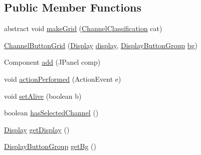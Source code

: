 \subsection*{Public Member Functions}
\begin{DoxyCompactItemize}
\item 
abstract void \hyperlink{classgov_1_1fnal_1_1ppd_1_1dd_1_1changer_1_1ChannelButtonGrid_a5acf39593b87514d5015b219e91ddeac}{make\-Grid} (\hyperlink{classgov_1_1fnal_1_1ppd_1_1dd_1_1changer_1_1ChannelClassification}{Channel\-Classification} cat)
\item 
\hyperlink{classgov_1_1fnal_1_1ppd_1_1dd_1_1changer_1_1ChannelButtonGrid_a71bade30c8299336c618dbc8f32b3a07}{Channel\-Button\-Grid} (\hyperlink{interfacegov_1_1fnal_1_1ppd_1_1dd_1_1signage_1_1Display}{Display} \hyperlink{classgov_1_1fnal_1_1ppd_1_1dd_1_1changer_1_1ChannelButtonGrid_a3c06b51489dcaacd16f6efcefe06bcaa}{display}, \hyperlink{classgov_1_1fnal_1_1ppd_1_1dd_1_1util_1_1DisplayButtonGroup}{Display\-Button\-Group} \hyperlink{classgov_1_1fnal_1_1ppd_1_1dd_1_1changer_1_1ChannelButtonGrid_adf258a89161282e5215b4642ecbec812}{bg})
\item 
Component \hyperlink{classgov_1_1fnal_1_1ppd_1_1dd_1_1changer_1_1ChannelButtonGrid_a456b0016723ac7fec8acaf6f7d6cbabf}{add} (J\-Panel comp)
\item 
void \hyperlink{classgov_1_1fnal_1_1ppd_1_1dd_1_1changer_1_1ChannelButtonGrid_afaef645111328ee05291017d3282201d}{action\-Performed} (Action\-Event e)
\item 
void \hyperlink{classgov_1_1fnal_1_1ppd_1_1dd_1_1changer_1_1ChannelButtonGrid_ae3b31f44dc32cfc243a1f10a3e0040c9}{set\-Alive} (boolean b)
\item 
boolean \hyperlink{classgov_1_1fnal_1_1ppd_1_1dd_1_1changer_1_1ChannelButtonGrid_af108bf6c3ca64c53f11326765fff1611}{has\-Selected\-Channel} ()
\item 
\hyperlink{interfacegov_1_1fnal_1_1ppd_1_1dd_1_1signage_1_1Display}{Display} \hyperlink{classgov_1_1fnal_1_1ppd_1_1dd_1_1changer_1_1ChannelButtonGrid_a08d1ab6630432d9e1817e36a9b6e857a}{get\-Display} ()
\item 
\hyperlink{classgov_1_1fnal_1_1ppd_1_1dd_1_1util_1_1DisplayButtonGroup}{Display\-Button\-Group} \hyperlink{classgov_1_1fnal_1_1ppd_1_1dd_1_1changer_1_1ChannelButtonGrid_a58309efc70714f1b3fc2810823a5df3c}{get\-Bg} ()
\end{DoxyCompactItemize}

